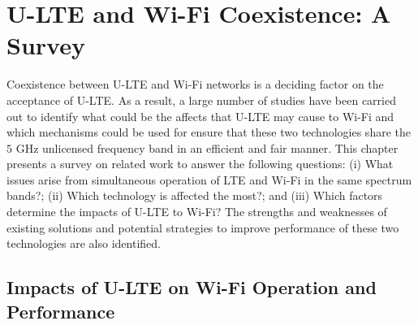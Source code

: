 %
%
%
\chapter{U-LTE and Wi-Fi Coexistence: A Survey}
\label{survey} %


Coexistence between \mbox{U-LTE} and \mbox{Wi-Fi} networks is a deciding factor on the acceptance of \mbox{U-LTE}. As a result, a large number of studies have been carried out to identify what could be the affects that \mbox{U-LTE} may cause to \mbox{Wi-Fi} and which mechanisms could be used for ensure that these two technologies share the $5$ GHz unlicensed frequency band in an efficient and fair manner. This chapter presents a survey on related work to answer the following questions: (i) What issues arise from simultaneous operation of LTE and \mbox{Wi-Fi} in the same spectrum bands?; (ii) Which technology is affected the most?; and (iii) Which factors determine the impacts of \mbox{U-LTE} to \mbox{Wi-Fi}? The strengths and weaknesses of existing solutions and potential strategies to improve performance of these two technologies are also identified.

\section{Impacts of U-LTE on Wi-Fi Operation and Performance}

